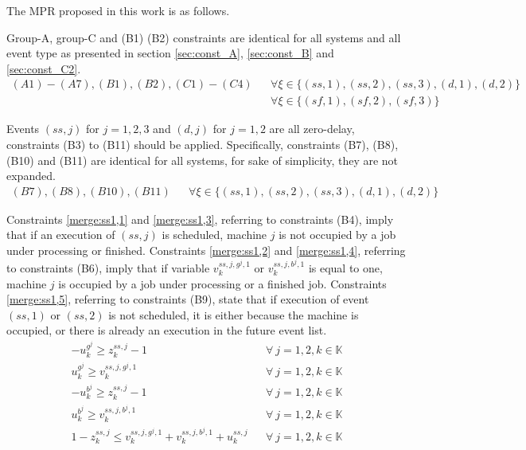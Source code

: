 \documentclass[]{interact}
\theoremstyle{plain}%
\theoremstyle{definition}
\theoremstyle{remark}
\begin{document}
The MPR proposed in this work is as follows.

Group-A, group-C and (B1) (B2) constraints are identical for all systems and all event type as presented in section \ref{sec:const_A},  \ref{sec:const_B} and \ref{sec:const_C2}. 
\begin{eqnarray}
(A1)-(A7),(B1),(B2),(C1)-(C4) && \forall \xi \in\{(ss,1),(ss,2),(ss,3),(d,1),(d,2)\}\nonumber\\
&&  \forall\xi \in\{(sf,1),(sf,2),(sf,3)\}\nonumber
\end{eqnarray}

Events $({ss,j})$ for $j=1,2,3$ and $({d,j})$ for $j=1,2$ are all zero-delay, constraints (B3) to (B11) should be applied. Specifically, constraints (B7), (B8), (B10) and (B11) are identical for all systems, for sake of simplicity, they are not expanded. 
\begin{eqnarray}
(B7),(B8),(B10),(B11)&& \forall \xi \in\{(ss,1),(ss,2),(ss,3),(d,1),(d,2)\}\nonumber
\end{eqnarray}

Constraints \eqref{merge:ss1,1} and \eqref{merge:ss1,3}, referring to constraints (B4), imply that if an execution of ${(ss,j)}$ is scheduled, machine $j$ is not occupied by a job under processing or finished. Constraints \eqref{merge:ss1,2} and \eqref{merge:ss1,4}, referring to constraints (B6), imply that if variable $v^{ss,j,g^j,1}_k$ or $v^{ss,j,b^j,1}_k$ is equal to one, machine $j$ is occupied by a job under processing or a finished job. Constraints \eqref{merge:ss1,5}, referring to constraints (B9), state that if execution of event ${(ss,1)}$ or ${(ss,2)}$ is not scheduled, it is either because the machine is occupied, or there is already an execution in the future event list. 
\begin{eqnarray}
-u^{g^j}_k\ge z^{ss,j}_k-1&& \forall\ j=1,2,k\in \mathbb{K}\label{merge:ss1,1}\\
u^{g^j}_k\ge v^{ss,j,g^j,1}_k&& \forall\ j=1,2,k\in \mathbb{K}\label{merge:ss1,2}\\
-u^{b^j}_k\ge z^{ss,j}_k-1&& \forall\ j=1,2,k\in \mathbb{K}\label{merge:ss1,3}\\
u^{b^j}_k\ge v^{ss,j,b^j,1}_k&& \forall\ j=1,2,k\in \mathbb{K}\label{merge:ss1,4}\\
1-z^{ss,j}_k\le v^{ss,j,g^j,1}_k+v^{ss,j,b^j,1}_k+u^{ss,j}_k&& \forall\ j=1,2,k\in \mathbb{K}\label{merge:ss1,5}
\end{eqnarray}
\end{document}
